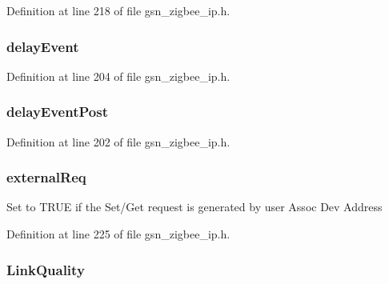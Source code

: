 Definition at line 218 of file gsn\_\-zigbee\_\-ip.h.

\hypertarget{a00440_ada69a538b8d3e7311a343b91f2b30f86}{
\subsubsection[{delayEvent}]{ {\bf delayEvent}}}
\label{a00440_ada69a538b8d3e7311a343b91f2b30f86}


Definition at line 204 of file gsn\_\-zigbee\_\-ip.h.

\hypertarget{a00440_a29e4d6bffd311d693fce3191c592236c}{
\subsubsection[{delayEventPost}]{ {\bf delayEventPost}}}
\label{a00440_a29e4d6bffd311d693fce3191c592236c}


Definition at line 202 of file gsn\_\-zigbee\_\-ip.h.

\hypertarget{a00440_a918d9ee8150c76110c706278f1d701d6}{
\subsubsection[{externalReq}]{ {\bf externalReq}}}
\label{a00440_a918d9ee8150c76110c706278f1d701d6}
Set to TRUE if the Set/Get request is generated by user Assoc Dev Address 

Definition at line 225 of file gsn\_\-zigbee\_\-ip.h.

\hypertarget{a00440_a0d0a983cfc03a9ab24197360ddad6dfb}{
\subsubsection[{LinkQuality}]{ {\bf LinkQuality}}}
\label{a00440_a0d0a983cfc03a9ab24197360ddad6dfb}


